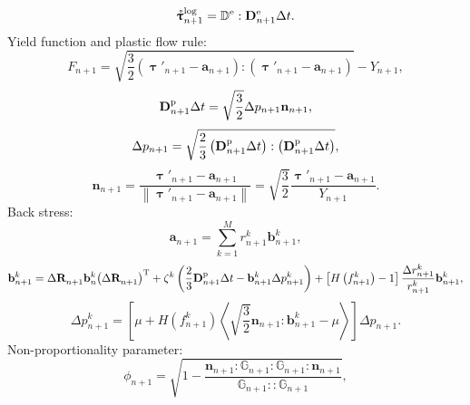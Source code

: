 \begin{equation}
\label{Equ_5:sigman+1}
\mathring {\bm{\uptau}}_{n + 1}^{\log } = {\mathbb{D}^{\rm{e}}}:{\mathbf{D}}_{n + 1}^{\rm e}\Delta t.
\end{equation}
Yield function and plastic flow rule:
\begin{equation}
\label{Equ_5:Fn+1}
{F_{n + 1}} = \sqrt {\frac{3}{2}\left( {{{\bm{\uptau}}'_{n + 1}} - {{\mathbf{a}}_{n + 1}}} \right):\left( {{{\bm{\uptau}}'_{n + 1}} - {{\mathbf{a}}_{n + 1}}} \right)}  - {Y_{n + 1}},
\end{equation}
\begin{equation}
\label{Equ_5:epsilonpn+1}
{\mathbf{D}}_{n + 1}^{\rm p}\Delta t = \sqrt {\frac{3}{2}} \Delta {p_{n + 1}}{{\mathbf{n}}_{n + 1}},
\end{equation}
\begin{equation}
\label{Equ_5:pn+1}
\Delta {p_{n + 1}} = \sqrt {\frac{2}{3} \left({\mathbf{D}}_{n + 1}^{\rm p}\Delta t\right):\left({\mathbf{D}}_{n + 1}^{\rm p}\Delta t\right)},
\end{equation}
\begin{equation}
\label{Equ_5:nn+1}
{{\mathbf{n}}_{n + 1}} = \frac{{{{\bm{\uptau}'}_{n + 1}} - {{\mathbf{a}}_{n + 1}}}}{{\left\| {{{\bm{\uptau}'}_{n + 1}} - {{\mathbf{a}}_{n + 1}}} \right\|}} = \sqrt {\frac{3}{2}} \frac{{{{\bm{\uptau}'}_{n + 1}} - {{\mathbf{a}}_{n + 1}}}}{{{Y_{n + 1}}}}.
\end{equation}
Back stress:
\begin{equation}
\label{Equ_5:an+1}
{{\mathbf{a}}_{n + 1}} = \sum\limits_{k = 1}^M {r_{n + 1}^k{\mathbf{b}}_{n + 1}^k},
\end{equation}
\begin{equation}
{{\mathbf{b}}_{n + 1}^k = \Delta {\mathbf{R}}_{n + 1}^{} {\mathbf{b}}_n^k {\left( {\Delta {\mathbf{R}}_{n + 1}^{}} \right)^{\rm{T}}} + {\zeta ^k}\left( {\frac{2}{3} {{\mathbf{D}}_{n + 1}^{\rm p}\Delta t} - {\mathbf{b}}_{n + 1}^k\Delta p_{n + 1}^k} \right) + \left[ {H\left( {f_{n + 1}^k} \right) - 1} \right]{\frac{{\Delta r_{n + 1}^k}}{{r_{n + 1}^k}}{\mathbf{b}}_{n + 1}^k}},
\end{equation}
\begin{equation}
\Delta p_{n + 1}^k = \left[ {\mu  + H\left( {f_{n + 1}^k} \right)\left\langle {\sqrt {\frac{3}{2}} {{\mathbf{n}}_{n + 1}}:{\mathbf{b}}_{n + 1}^k - \mu } \right\rangle } \right]\Delta {p_{n + 1}}.
\end{equation}
Non-proportionality parameter:
\begin{equation}
{\phi _{n + 1}} = \sqrt {1 - \frac{{{{\mathbf{n}}_{n + 1}}:{\mathbb{G}_{n + 1}}:{\mathbb{G}_{n + 1}}:{{\mathbf{n}}_{n + 1}}}}{{{\mathbb{G}_{n + 1}}::{\mathbb{G}_{n + 1}}}}},
\end{equation}
